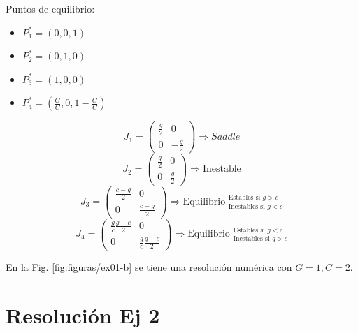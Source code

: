 \documentclass[twocolumn,aps,prl]{revtex4-1}
\begin{document}
Puntos de equilibrio:
\begin{itemize}
    \item[] $P_1^* = (0, 0, 1 )$
    \item[] $P_2^* = (0, 1, 0)$
    \item[] $P_3^* = (1, 0, 0)$
    \item[] $P_4^* = (\frac{G}{C}, 0, 1- \frac{G}{C})$
\end{itemize}
$$ J_1 =
\begin{pmatrix}
    \frac{g}{2}
    &
    0
    \\  
    0
    &
    -\frac{g}{2}
\end{pmatrix}
\Rightarrow Saddle
$$
$$
J_2 =
\begin{pmatrix}
    \frac{g}{2}
    &
    0
    \\  
    0
    &
    \frac{g}{2}
\end{pmatrix}
\Rightarrow \text{Inestable}
$$
$$
J_3 =
\begin{pmatrix}
    \frac{c-g}{2}
    &
    0
    \\  
    0
    &
    \frac{c-g}{2}
\end{pmatrix}
\Rightarrow \text{Equilibrio }  ^{\text{Estables si } g>c}_{\text{Inestables si } g<c}
$$
$$
J_4 =
\begin{pmatrix}
    \frac{g}{c} \frac{g-c}{2}
    &
    0
    \\  
    0
    &
    \frac{g}{c} \frac{g-c}{2}
\end{pmatrix}
\Rightarrow \text{Equilibrio }  ^{\text{Estables si } g<c}_{\text{Inestables si } g>c}
$$

En la Fig. \ref{fig:figuras/ex01-b} se tiene una resolución numérica con $G=1, C=2$.

\section{Resolución Ej 2}
\end{document}
